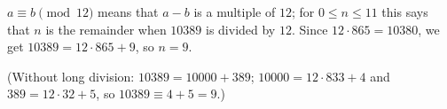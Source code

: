 $a\equiv b\pmod{12}$ means that $a-b$ is a multiple of $12$; for $0\le n\le11$ this says that $n$ is the remainder when $10389$ is divided by $12$. Since $12\cdot865=10380$, we get $10389=12\cdot865+9$, so $n=\boxed{9}$.

(Without long division: $10389=10000+389$; $10000=12\cdot833+4$ and $389=12\cdot32+5$, so $10389\equiv4+5=9$.)
